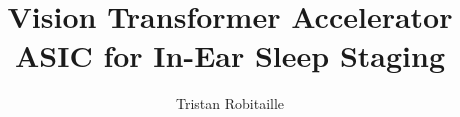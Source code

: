 \title{Vision Transformer Accelerator ASIC for In-Ear Sleep Staging}
\author{Tristan Robitaille}
\newcommand{\supervisor}{Professor Xilin Liu}
\makeatletter
\renewcommand{\maketitle}{%
    \begin{titlepage}
        \onehalfspacing
        \begin{center}
            {\Large\textbf{\@title}\par}
            \vspace{2cm}
            by\par
            {\large{\@author}\par}
            \vspace{2cm}
            {\large Supervisor: \supervisor \\April 2024}
        \end{center}

        \vfill

        \begin{flushright}
        {\Huge\textbf{B.A.Sc. Thesis}}
        \end{flushright}

        \vspace{0.1\baselineskip}


\end{titlepage}}
